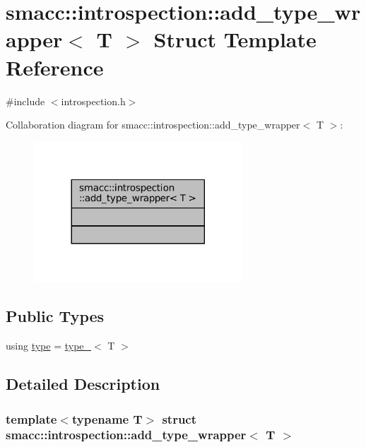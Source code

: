 \hypertarget{structsmacc_1_1introspection_1_1add__type__wrapper}{}\section{smacc\+:\+:introspection\+:\+:add\+\_\+type\+\_\+wrapper$<$ T $>$ Struct Template Reference}
\label{structsmacc_1_1introspection_1_1add__type__wrapper}


{\ttfamily \#include $<$introspection.\+h$>$}



Collaboration diagram for smacc\+:\+:introspection\+:\+:add\+\_\+type\+\_\+wrapper$<$ T $>$\+:
\nopagebreak
\begin{figure}[H]
\begin{center}
\leavevmode
\includegraphics[width=221pt]{structsmacc_1_1introspection_1_1add__type__wrapper__coll__graph}
\end{center}
\end{figure}
\subsection*{Public Types}
\begin{DoxyCompactItemize}
\item 
using \hyperlink{structsmacc_1_1introspection_1_1add__type__wrapper_a4390a0426686e1e115d4c3ad22165cd9}{type} = \hyperlink{structsmacc_1_1introspection_1_1type__}{type\+\_\+}$<$ T $>$
\end{DoxyCompactItemize}


\subsection{Detailed Description}
\subsubsection*{template$<$typename T$>$\newline
struct smacc\+::introspection\+::add\+\_\+type\+\_\+wrapper$<$ T $>$}



